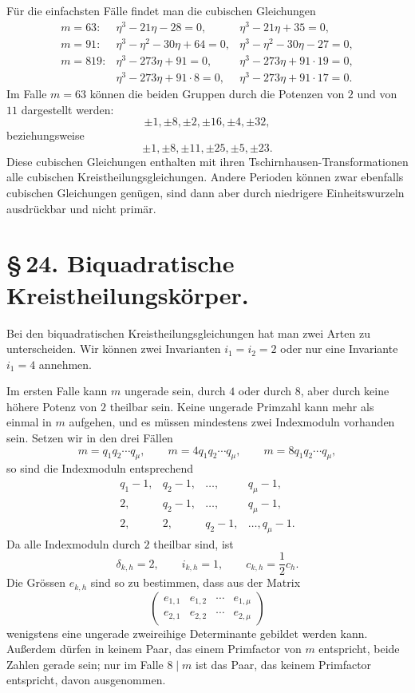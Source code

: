 \documentclass[11pt]{article}
\begin{document}
Für die einfachsten Fälle findet man die cubischen Gleichungen
\[
\begin{array}{rcl}
 m=63:& \eta^3-21\eta-28=0,&
        \eta^3-21\eta+35=0,\\[2mm]
 m=91:& \eta^3-\eta^2-30\eta+64=0,&
        \eta^3-\eta^2-30\eta-27=0,\\[2mm]
 m=819:& \eta^3-273\eta+91=0,&
        \eta^3-273\eta+91\cdot19=0,\\
       & \eta^3-273\eta+91\cdot8=0,&
        \eta^3-273\eta+91\cdot17=0.
\end{array}
\]
Im Falle $m=63$ können die beiden Gruppen durch die Potenzen von $2$ und von $11$ dargestellt werden:
\[
   \pm1,\pm8,\pm2,\pm16,\pm4,\pm32,
\]
beziehungsweise
\[
   \pm1,\pm8,\pm11,\pm25,\pm5,\pm23.
\]
Diese cubischen Gleichungen enthalten mit ihren Tschirnhausen-Transformationen alle cubischen Kreistheilungsgleichungen. Andere Perioden können zwar ebenfalls cubischen Gleichungen genügen, sind dann aber durch niedrigere Einheitswurzeln ausdrückbar und nicht primär.

\section*{\S\,24. Biquadratische Kreistheilungskörper.}

Bei den biquadratischen Kreistheilungsgleichungen hat man zwei Arten zu unterscheiden. Wir können zwei Invarianten $i_1=i_2=2$ oder nur eine Invariante $i_1=4$ annehmen.

Im ersten Falle kann $m$ ungerade sein, durch $4$ oder durch $8$, aber durch keine höhere Potenz von $2$ theilbar sein. Keine ungerade Primzahl kann mehr als einmal in $m$ aufgehen, und es müssen mindestens zwei Indexmoduln vorhanden sein. Setzen wir in den drei Fällen
\[
   m=q_1q_2\cdots q_\mu,
   \qquad
   m=4q_1q_2\cdots q_\mu,
   \qquad
   m=8q_1q_2\cdots q_\mu,
\]
so sind die Indexmoduln entsprechend
\[
\begin{array}{cccc}
q_1-1,&q_2-1,&\ldots,&q_\mu-1,\\
2,&q_2-1,&\ldots,&q_\mu-1,\\
2,&2,&q_2-1,&\ldots,q_\mu-1.
\end{array}
\]
Da alle Indexmoduln durch $2$ theilbar sind, ist
\begin{equation}
   \delta_{k,h}=2,
   \qquad i_{k,h}=1,
   \qquad c_{k,h}=\frac12c_h.
   \tag{1}
\end{equation}
Die Grössen $e_{k,h}$ sind so zu bestimmen, dass aus der Matrix
\begin{equation}
\begin{pmatrix}
 e_{1,1}&e_{1,2}&\cdots&e_{1,\mu}\\
 e_{2,1}&e_{2,2}&\cdots&e_{2,\mu}
\end{pmatrix}
\tag{2}
\end{equation}
wenigstens eine ungerade zweireihige Determinante gebildet werden kann. Außerdem dürfen in keinem Paar, das einem Primfactor von $m$ entspricht, beide Zahlen gerade sein; nur im Falle $8\mid m$ ist das Paar, das keinem Primfactor entspricht, davon ausgenommen.
\end{document}
